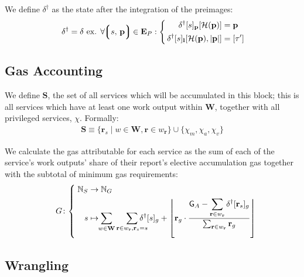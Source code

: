 We define $\delta^\dagger$ as the state after the integration of the preimages:
\begin{align}
    \delta^\dagger = \delta \text{ ex. } \forall \tup{s\ts\mathbf{p}} \in \xtpreimages : \left\{\,\begin{aligned}
      \quad\delta^\dagger[s]_\mathbf{p}[\mathcal{H}(\mathbf{p})] &= \mathbf{p} \\
      \delta^\dagger[s]_\mathbf{l}[\mathcal{H}(\mathbf{p}), |\mathbf{p}|] &= [\tau']
    \end{aligned}\right.\!\!
\end{align}



\subsection{Gas Accounting}

We define $\mathbf{S}$, the set of all services which will be accumulated in this block; this is all services which have at least one work output within $\mathbf{W}$, together with all privileged services, $\chi$. Formally:
\begin{align}\label{eq:servicestoaccumulate}
  \mathbf{S} \equiv \{ \mathbf{r}_s \mid w \in \mathbf{W}, \mathbf{r} \in w_\mathbf{r} \} \cup \{ \chi_m, \chi_a, \chi_v \}
\end{align}

We calculate the gas attributable for each service as the sum of each of the service's work outputs' share of their report's elective accumulation gas together with the subtotal of minimum gas requirements:
\begin{equation}
  G\colon\left\{\;\begin{aligned}
    \N_S &\to \N_G \\
    \displaystyle s &\mapsto \!\!\sum_{w \in \mathbf{W}}\sum_{\mathbf{r} \in w_\mathbf{r} , \mathbf{r}_s = s}{\!\!\!\!\!\!\!\delta^\dagger[s]_g + \left \lfloor \mathbf{r}_g\cdot\frac{\displaystyle \mathsf{G}_A - \sum_{\mathbf{r} \in w_\mathbf{r}}{\delta^\dagger[\mathbf{r}_s]_g}}{\sum_{\mathbf{r} \in w_\mathbf{r}}{\mathbf{r}_g}} \right \rfloor }
  \end{aligned}\right.\!\!\!\!\!\!
\end{equation}

\subsection{Wrangling}

